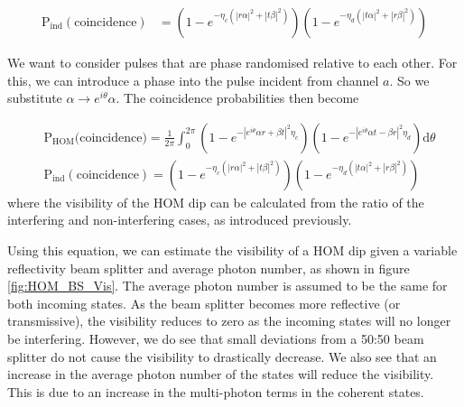 
\begin{align}
	\text{P}_\text{ind}(\text{coincidence}) &= \left(1 - e^{-\eta_c(|r\alpha|^2 + |t\beta|^2)}\right)\left(1 - e^{-\eta_d(|t\alpha|^2 + |r\beta|^2)}\right)
\end{align}

We want to consider pulses that are phase randomised relative to each other. For this, we can introduce a phase into the pulse incident from channel $a$. So we substitute $\alpha \rightarrow  e^{i\theta} \alpha$. The coincidence probabilities then become

\begin{align}
	&\text{P}_\text{HOM}\text{(coincidence)} = \frac{1}{2\pi}\int_0^{2\pi}\left(1 - e^{-|e^{i\theta}\alpha r + \beta t|^2 \eta_c}\right)\left(1 - e^{-|e^{i\theta}\alpha t - \beta r|^2 \eta_d}\right)\text{d}\theta\\
	&\text{P}_\text{ind}(\text{coincidence}) = \left(1 - e^{-\eta_c(|r\alpha|^2 + |t\beta|^2)}\right)\left(1 - e^{-\eta_d(|t\alpha|^2 + |r\beta|^2)}\right)
\end{align}
where the visibility of the HOM dip can be calculated from the ratio of the interfering and non-interfering cases, as introduced previously.

Using this equation, we can estimate the visibility of a \ac{HOM} dip given a variable reflectivity beam splitter and average photon number, as shown in figure \ref{fig:HOM_BS_Vis}. The average photon number is assumed to be the same for both incoming states. As the beam splitter becomes more reflective (or transmissive), the visibility reduces to zero as the incoming states will no longer be interfering. However, we do see that small deviations from a {50:50} beam splitter do not cause the visibility to drastically decrease. We also see that an increase in the average photon number of the states will reduce the visibility. This is due to an increase in the multi-photon terms in the coherent states.


